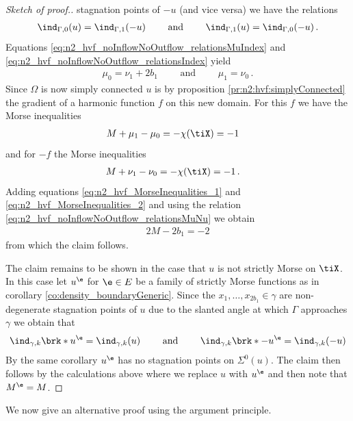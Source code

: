 \begin{proof}[Sketch of proof.]
  stagnation points of $-u$ (and vice versa) we have the relations
  \begin{align}
    \ind_{\Gamma,0}(u)=\ind_{\Gamma,1}(-u) \qquad\text{ and }\qquad
    \ind_{\Gamma,1}(u)=\ind_{\Gamma,0}(-u)\,.\label{eq:n2_hvf_noInflowNoOutflow_relationsIndex}
  \end{align}
  Equations \eqref{eq:n2_hvf_noInflowNoOutflow_relationsMuIndex} and \eqref{eq:n2_hvf_noInflowNoOutflow_relationsIndex}
  yield 
  \begin{align}
    \mu_0=\nu_1+2b_1 \qquad\text{ and }\qquad
    \mu_1=\nu_0\,.\label{eq:n2_hvf_noInflowNoOutflow_relationsMuNu}
  \end{align}
  Since $\Omega$ is now simply connected $u$ is 
  by proposition \ref{pr:n2:hvf:simplyConnected}
  the gradient of a harmonic function $f$ on this new domain.
  For this $f$ we have the Morse inequalities
  \begin{align}
    M+\mu_1-\mu_0&=-\chi(\tiX)=-1 \label{eq:n2_hvf_MorseInequalities_1}
  \end{align}
  and for $-f$ the Morse inequalities
  \begin{align}
    M+\nu_1-\nu_0&=-\chi(\tiX)=-1\,. \label{eq:n2_hvf_MorseInequalities_2}
  \end{align}
  Adding equations \eqref{eq:n2_hvf_MorseInequalities_1} and \eqref{eq:n2_hvf_MorseInequalities_2} and using the relation
  \eqref{eq:n2_hvf_noInflowNoOutflow_relationsMuNu} we obtain
  \begin{align*}
    2M-2b_1=-2
  \end{align*}
  from which the claim follows.

  The claim remains to be shown in the case that $u$ is not strictly Morse on $\tiX$. In this case let
  $u^\e$ for $\e\in E$ be a family of strictly Morse functions as in corollary \ref{co:density_boundaryGeneric}.
  Since the $x_1,\dots,x_{2b_1}\in\gamma$ are non-degenerate stagnation points of $u$
  due to the slanted angle at which
  $\Gamma$ approaches $\gamma$
  we obtain that
  \begin{align}
    \ind_{\gamma,k}\brk*{u^\e}=\ind_{\gamma,k}(u)\qquad\text{ and }\qquad 
    \ind_{\gamma,k}\brk*{-u^\e}=\ind_{\gamma,k}(-u)
    \label{eq:n3_disproof_morse_indexApprox}
  \end{align}
  By the same corollary $u^\e$ has no stagnation points on $\Sigma^0(u)$.
  The claim then follows by the calculations above where we replace
  $u$ with $u^\e$ and then note that $M^\e=M$.
\end{proof}
We now give an alternative proof using the argument principle.

